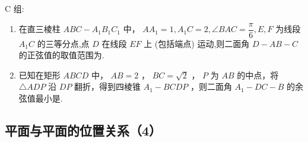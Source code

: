 \begin{enumerate}
\begin{jieda}
\begin{enumerate}
    \end{enumerate}
\end{jieda}

    
\end{enumerate}

C 组:
\begin{enumerate}

\item 在直三棱柱 $ {ABC} - {A}_{1}{B}_{1}{C}_{1} $ 中， $ {A{A}_{1}} = 1,{{A}_{1}C} = 2,{\angle {BAC}} = \dfrac{\pi }{6},E,F $ 为线段 $ {A}_{1}C $ 的三等分点,点 $ D $ 在线段 $ {EF} $ 上 (包括端点) 运动,则二面角 $ D - {AB} - C $ 的正弦值的取值范围为.

\item 已知在矩形 $ {ABCD} $ 中， $ {AB} = 2 $ ， $ {BC} = \sqrt{2} $ ， $ P $ 为 $ {AB} $ 的中点，将 $ \bigtriangleup  {ADP} $ 沿 $ {DP} $ 翻折，得到四棱锥 $ {A}_{1} - {BCDP} $ ，则二面角 $ {A}_{1} - {DC} - B $ 的余弦值最小是.



\end{enumerate}


\clearpage

\subsection*{平面与平面的位置关系（4）}

